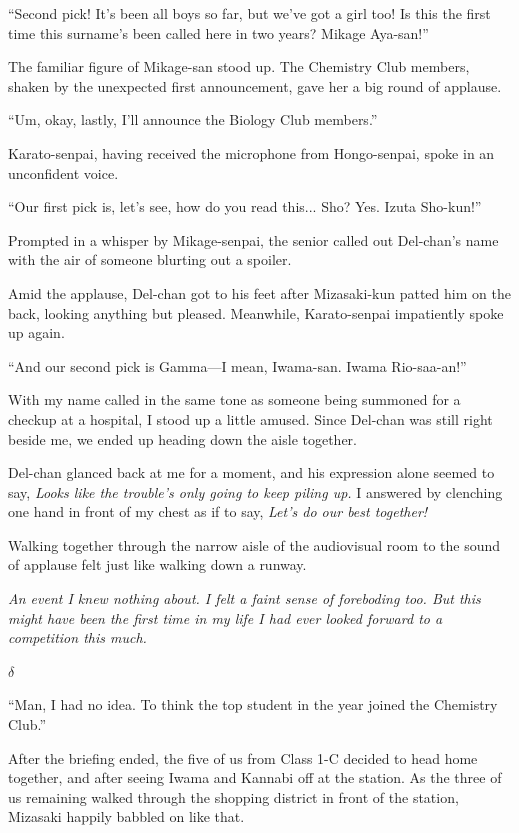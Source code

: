 \documentclass[
    a4paper,
    12pt,
    twoside,
    openany,
    UTF8,
    fontset=windows
]{ctexbook}
\begin{document}
``Second pick! It's been all boys so far, but we've got a girl too! Is this the first time this surname's been called here in two years? Mikage Aya-san!''

The familiar figure of Mikage-san stood up. The Chemistry Club members, shaken by the unexpected first announcement, gave her a big round of applause.

``Um, okay, lastly, I'll announce the Biology Club members.''

Karato-senpai, having received the microphone from Hongo-senpai, spoke in an unconfident voice.

``Our first pick is, let's see, how do you read this... Sho? Yes. Izuta Sho-kun!''

Prompted in a whisper by Mikage-senpai, the senior called out Del-chan's name with the air of someone blurting out a spoiler.

Amid the applause, Del-chan got to his feet after Mizasaki-kun patted him on the back, looking anything but pleased. Meanwhile, Karato-senpai impatiently spoke up again.

``And our second pick is Gamma---I mean, Iwama-san. Iwama Rio-saa-an!''

With my name called in the same tone as someone being summoned for a checkup at a hospital, I stood up a little amused. Since Del-chan was still right beside me, we ended up heading down the aisle together.

Del-chan glanced back at me for a moment, and his expression alone seemed to say, \textit{Looks like the trouble's only going to keep piling up.} I answered by clenching one hand in front of my chest as if to say, \textit{Let's do our best together!}

Walking together through the narrow aisle of the audiovisual room to the sound of applause felt just like walking down a runway.

\textit{An event I knew nothing about. I felt a faint sense of foreboding too. But this might have been the first time in my life I had ever looked forward to a competition this much.}

$\delta$

``Man, I had no idea. To think the top student in the year joined the Chemistry Club.''

After the briefing ended, the five of us from Class 1-C decided to head home together, and after seeing Iwama and Kannabi off at the station. As the three of us remaining walked through the shopping district in front of the station, Mizasaki happily babbled on like that.
\end{document}
